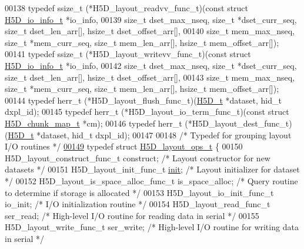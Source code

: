 \begin{DoxyCode}
00138 \textcolor{keyword}{typedef} ssize\_t (*H5D\_layout\_readvv\_func\_t)(\textcolor{keyword}{const} \textcolor{keyword}{struct }\hyperlink{struct_h5_d__io__info__t}{H5D\_io\_info\_t} *io\_info,
00139     \textcolor{keywordtype}{size\_t} dset\_max\_nseq, \textcolor{keywordtype}{size\_t} *dset\_curr\_seq, \textcolor{keywordtype}{size\_t} dset\_len\_arr[], hsize\_t dset\_offset\_arr[],
00140     \textcolor{keywordtype}{size\_t} mem\_max\_nseq, \textcolor{keywordtype}{size\_t} *mem\_curr\_seq, \textcolor{keywordtype}{size\_t} mem\_len\_arr[], hsize\_t mem\_offset\_arr[]);
00141 \textcolor{keyword}{typedef} ssize\_t (*H5D\_layout\_writevv\_func\_t)(\textcolor{keyword}{const} \textcolor{keyword}{struct }\hyperlink{struct_h5_d__io__info__t}{H5D\_io\_info\_t} *io\_info,
00142     \textcolor{keywordtype}{size\_t} dset\_max\_nseq, \textcolor{keywordtype}{size\_t} *dset\_curr\_seq, \textcolor{keywordtype}{size\_t} dset\_len\_arr[], hsize\_t dset\_offset\_arr[],
00143     \textcolor{keywordtype}{size\_t} mem\_max\_nseq, \textcolor{keywordtype}{size\_t} *mem\_curr\_seq, \textcolor{keywordtype}{size\_t} mem\_len\_arr[], hsize\_t mem\_offset\_arr[]);
00144 \textcolor{keyword}{typedef} herr\_t (*H5D\_layout\_flush\_func\_t)(\hyperlink{struct_h5_d__t}{H5D\_t} *dataset, hid\_t dxpl\_id);
00145 \textcolor{keyword}{typedef} herr\_t (*H5D\_layout\_io\_term\_func\_t)(\textcolor{keyword}{const} \textcolor{keyword}{struct }\hyperlink{struct_h5_d__chunk__map__t}{H5D\_chunk\_map\_t} *cm);
00146 \textcolor{keyword}{typedef} herr\_t (*H5D\_layout\_dest\_func\_t)(\hyperlink{struct_h5_d__t}{H5D\_t} *dataset, hid\_t dxpl\_id);
00147 
00148 \textcolor{comment}{/* Typedef for grouping layout I/O routines */}
\hyperlink{struct_h5_d__layout__ops__t}{00149} \textcolor{keyword}{typedef} \textcolor{keyword}{struct }\hyperlink{struct_h5_d__layout__ops__t}{H5D\_layout\_ops\_t} \{
00150     H5D\_layout\_construct\_func\_t construct;      \textcolor{comment}{/* Layout constructor for new datasets */}
00151     H5D\_layout\_init\_func\_t \hyperlink{structinit}{init};        \textcolor{comment}{/* Layout initializer for dataset */}
00152     H5D\_layout\_is\_space\_alloc\_func\_t is\_space\_alloc;    \textcolor{comment}{/* Query routine to determine if storage is
       allocated */}
00153     H5D\_layout\_io\_init\_func\_t io\_init;  \textcolor{comment}{/* I/O initialization routine */}
00154     H5D\_layout\_read\_func\_t ser\_read;    \textcolor{comment}{/* High-level I/O routine for reading data in serial */}
00155     H5D\_layout\_write\_func\_t ser\_write;  \textcolor{comment}{/* High-level I/O routine for writing data in serial */}

\end{DoxyCode}
